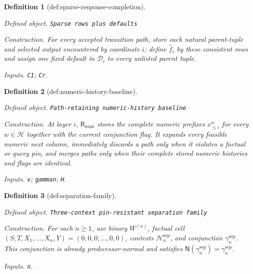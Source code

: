 \documentclass{article}
\newtheorem{definition}{Definition}
\begin{document}
\begin{definition}[def:sparse-response-completion]\label{def:sparse-response-completion}
\par\smallskip\noindent\emph{Defined object.} \texttt{Sparse rows plus defaults}
\par\smallskip\noindent\emph{Construction.} For every accepted transition path, store each natural parent-tuple and selected output encountered by coordinate \(i\); define \(\widehat f_i\) by these consistent rows and assign one fixed default in \(\mathcal D_i\) to every unlisted parent tuple.
\par\smallskip\noindent\emph{Inputs.} \texttt{C1}; \texttt{Cr}.
\end{definition}

\begin{definition}[def:numeric-history-baseline]\label{def:numeric-history-baseline}
\par\smallskip\noindent\emph{Defined object.} \texttt{Path-\allowbreak{}retaining numeric-\allowbreak{}history baseline}
\par\smallskip\noindent\emph{Construction.} At layer \(i\), \(\mathsf R_{\mathrm{num}}\) stores the complete numeric prefixes \(x^w_{\leq i}\) for every \(w\in\mathcal H\) together with the current conjunction flag. It expands every feasible numeric next column, immediately discards a path only when it violates a factual or query pin, and merges paths only when their complete stored numeric histories and flags are identical.
\par\smallskip\noindent\emph{Inputs.} \texttt{v}; \texttt{gamman}; \texttt{H}.
\end{definition}

\begin{definition}[def:separation-family]\label{def:separation-family}
\par\smallskip\noindent\emph{Defined object.} \texttt{Three-\allowbreak{}context pin-\allowbreak{}resistant separation family}
\par\smallskip\noindent\emph{Construction.} For each \(n\geq1\), use binary \(W^{(n)}\), factual cell \((S,T,X_1,\ldots,X_n,Y)=(0,0,0,\ldots,0,0)\), contexts \(\mathcal H_n^{\mathrm{sep}}\), and conjunction \(\gamma_n^{\mathrm{sep}}\). This conjunction is already predecessor-normal and satisfies \(\mathsf N(\gamma_n^{\mathrm{sep}})=\gamma_n^{\mathrm{sep}}\).
\par\smallskip\noindent\emph{Inputs.} \texttt{n}.
\end{definition}
\end{document}
